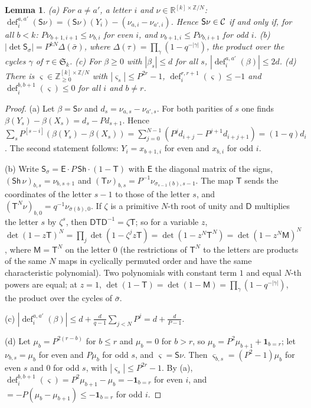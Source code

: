 \documentclass[10pt]{amsart}
\newtheorem{lemma}[theorem]{Lemma}
\theoremstyle{definition}
\theoremstyle{remark}
\newcommand{\R}{\mathbb R}
\newcommand{\Z}{\mathbb Z}
\providecommand{\phdef}{\operatorname{def}}
\begin{document}
\begin{lemma}\label{pe:coord}
{\rm(a)} For $a\ne a'$, a letter $i$ and $\nu\in\R^{[k]\times\Z/N}$:
$\phdef_i^{a,a'}(\mathsf S\nu)=(\mathsf S\nu)(Y_i)-(\nu_{a,i}-\nu_{a',i})$. Hence $\mathsf S\nu\in
\mathcal C$ if and only if, for all $b<k$: $P\nu_{b+1,i+1}\le\nu_{b,i}$ for even $i$, and
$\nu_{b+1,i}\le P\nu_{b,i+1}$ for odd $i$.
{\rm(b)} $|\det\mathsf S_\sigma|=P^{kN}\Delta(\bar\sigma)$, where $\Delta(\tau)=\prod_{\gamma}(1-
q^{-|\gamma|})$, the product over the cycles $\gamma$ of $\tau\in\mathfrak S_k$.
{\rm(c)} For $\beta\ge0$ with $|\beta_s|\le d$ for all $s$, $|\phdef_i^{a,a'}(\beta)|\le2d$.
{\rm(d)} There is $\varsigma\in\Z_{\ge0}^{[k]\times\Z/N}$ with $|\varsigma_s|\le P^{2r}-1$,
$\phdef_i^{r,r+1}(\varsigma)\le-1$ and $\phdef_i^{b,b+1}(\varsigma)\le0$ for all $i$ and $b\ne r$.
\end{lemma}
\begin{proof}
(a) Let $\beta=\mathsf S\nu$ and $d_s=\nu_{a,s}-\nu_{a',s}$. For both parities of $s$ one finds
$\beta(Y_s)-\beta(X_s)=d_s-Pd_{s+1}$. Hence $\sum_sP^{[s-i]}(\beta(Y_s)-\beta(X_s))=\sum_{j=0}^{N-1}
(P^jd_{i+j}-P^{j+1}d_{i+j+1})=(1-q)d_i$. The second statement follows: $Y_i=x_{b+1,i}$ for even
and $x_{b,i}$ for odd $i$.

(b) Write $\mathsf S_\sigma=\mathsf E\cdot P\,\mathsf{Sh}\cdot(1-\mathsf T)$ with $\mathsf E$ the
diagonal matrix of the signs, $(\mathsf{Sh}\,\nu)_{b,s}=\nu_{b,s+1}$ and $(\mathsf T\nu)_{b,s}=
P^{-1}\nu_{\sigma_{s-1}(b),s-1}$. The map $\mathsf T$ sends the coordinates of the letter $s-1$ to
those of the letter $s$, and $(\mathsf T^N\nu)_{b,0}=q^{-1}\nu_{\bar\sigma(b),0}$. If $\zeta$ is a
primitive $N$-th root of unity and $\mathsf D$ multiplies the letter $s$ by $\zeta^s$, then
$\mathsf D\mathsf T\mathsf D^{-1}=\zeta\mathsf T$; so for a variable $z$,
$\det(1-z\mathsf T)^N=\prod_j\det(1-\zeta^jz\mathsf T)=\det(1-z^N\mathsf T^N)=\det(1-z^N\mathsf
M)^N$, where $\mathsf M=\mathsf T^N$ on the letter $0$ (the restrictions of $\mathsf T^N$ to the
letters are products of the same $N$ maps in cyclically permuted order and have the same
characteristic polynomial). Two polynomials with constant term $1$ and equal $N$-th powers are
equal; at $z=1$, $\det(1-\mathsf T)=\det(1-\mathsf M)=\prod_\gamma(1-q^{-|\gamma|})$, the product
over the cycles of $\bar\sigma$.

(c) $|\phdef_i^{a,a'}(\beta)|\le d+\frac d{q-1}\sum_{j<N}P^j=d+\frac d{P-1}$.

(d) Let $\mu_b=P^{2(r-b)}$ for $b\le r$ and $\mu_b=0$ for $b>r$, so $\mu_b=P^2\mu_{b+1}+\mathbf
1_{b=r}$; let $\nu_{b,s}=\mu_b$ for even and $P\mu_b$ for odd $s$, and $\varsigma=\mathsf S\nu$.
Then $\varsigma_{b,s}=(P^2-1)\mu_b$ for even $s$ and $0$ for odd $s$, with $|\varsigma_s|\le
P^{2r}-1$. By (a), $\phdef_i^{b,b+1}(\varsigma)=P^2\mu_{b+1}-\mu_b=-\mathbf 1_{b=r}$ for even $i$,
and $=-P(\mu_b-\mu_{b+1})\le-\mathbf 1_{b=r}$ for odd $i$.
\end{proof}
\end{document}
